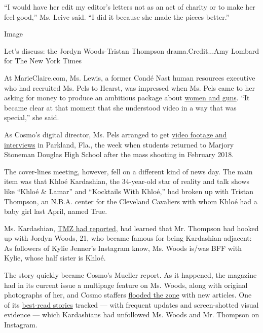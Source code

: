 ``I would have her edit my editor's letters not as an act of charity or
to make her feel good,'' Ms. Leive said. ``I did it because she made the
pieces better.''

Image

Let's discuss: the Jordyn Woods-Tristan Thompson drama.Credit...Amy
Lombard for The New York Times

At MarieClaire.com, Ms. Lewis, a former Condé Nast human resources
executive who had recruited Ms. Pels to Hearst, was impressed when Ms.
Pels came to her asking for money to produce an ambitious package about
\href{https://www.marieclaire.com/politics/a18016/women-and-guns/}{women
and guns}. ``It became clear at that moment that she understood video in
a way that was special,'' she said.

As Cosmo's digital director, Ms. Pels arranged to get
\href{https://www.cosmopolitan.com/politics/a19183766/video-parkland-marjory-stoneman-douglas-teachers-first-week-back/}{video
footage and interviews} in Parkland, Fla., the week when students
returned to Marjory Stoneman Douglas High School after the mass shooting
in February 2018.

The cover-lines meeting, however, fell on a different kind of news day.
The main item was that Khloé Kardashian, the 34-year-old star of reality
and talk shows like ``Khloé \& Lamar'' and ``Kocktails With Khloé,'' had
broken up with Tristan Thompson, an N.B.A. center for the Cleveland
Cavaliers with whom Khloé had a baby girl last April, named True.

Ms. Kardashian,
\href{https://www.tmz.com/2019/02/19/khloe-kardashian-splits-tristan-thompson-cheating-kylie-jenner-jordyn-woods/}{TMZ
had reported}, had learned that Mr. Thompson had hooked up with Jordyn
Woods, 21, who became famous for being Kardashian-adjacent: As followers
of Kylie Jenner's Instagram know, Ms. Woods is/was BFF with Kylie, whose
half sister is Khloé.

The story quickly became Cosmo's Mueller report. As it happened, the
magazine had in its current issue a multipage feature on Ms. Woods,
along with original photographs of her, and Cosmo staffers
\href{https://www.cosmopolitan.com/uk/search/?q=jordyn+woods}{flooded
the zone} with new articles. One of its
\href{https://www.cosmopolitan.com/entertainment/a26420650/kardashians-unfollow-tristan-thompson-jordyn-woods-instagram/}{best-read
stories} tracked --- with frequent updates and screen-shotted visual
evidence --- which Kardashians had unfollowed Ms. Woods and Mr. Thompson
on Instagram.

